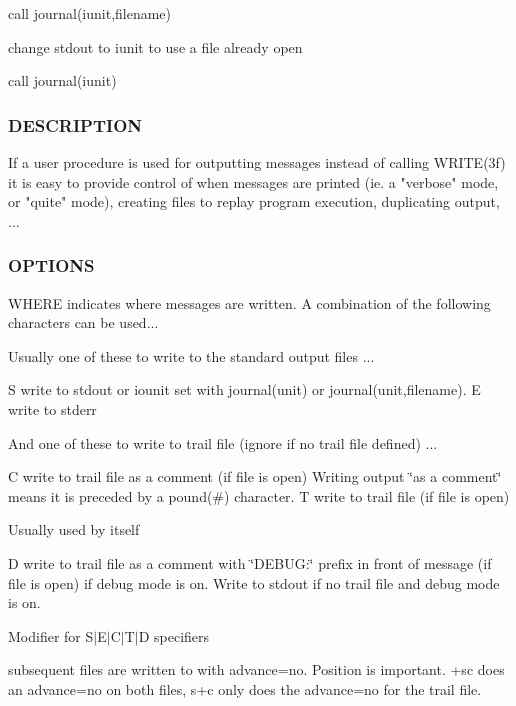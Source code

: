call journal(iunit,filename)

change stdout to iunit to use a file already open

call journal(iunit)

\subsubsection*{D\+E\+S\+C\+R\+I\+P\+T\+I\+ON}

\begin{DoxyVerb}If a user procedure is used for outputting messages instead of calling
WRITE(3f) it is easy to provide control of when messages are printed
(ie. a "verbose" mode, or "quite" mode), creating files to replay
program execution, duplicating output, ...
\end{DoxyVerb}


\subsubsection*{O\+P\+T\+I\+O\+NS}

W\+H\+E\+RE indicates where messages are written. A combination of the following characters can be used...

Usually one of these to write to the standard output files ...

S write to stdout or iounit set with journal(unit) or journal(unit,filename). E write to stderr

And one of these to write to trail file (ignore if no trail file defined) ...

C write to trail file as a comment (if file is open) Writing output \char`\"{}as a comment\char`\"{} means it is preceded by a pound(\#) character. T write to trail file (if file is open)

Usually used by itself

D write to trail file as a comment with \char`\"{}\+D\+E\+B\+U\+G\+:\char`\"{} prefix in front of message (if file is open) if debug mode is on. Write to stdout if no trail file and debug mode is on.

Modifier for S$\vert$\+E$\vert$\+C$\vert$\+T$\vert$D specifiers


\begin{DoxyItemize}
\item subsequent files are written to with advance=\textquotesingle{}no\textquotesingle{}. Position is important. \textquotesingle{}+sc\textquotesingle{} does an advance=\textquotesingle{}no\textquotesingle{} on both files, \textquotesingle{}s+c\textquotesingle{} only does the advance=\textquotesingle{}no\textquotesingle{} for the trail file.
\end{DoxyItemize}

